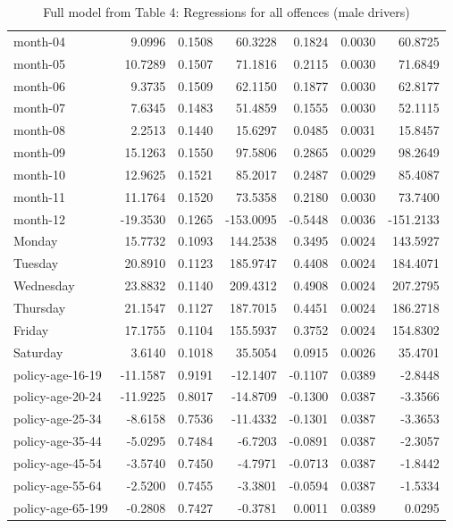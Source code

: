 \documentclass[10pt]{article}
\begin{document}
\begin{table}[ht]
\begin{tabular}{lrrrrrr}
  month-04 & 9.0996 & 0.1508 & 60.3228 & 0.1824 & 0.0030 & 60.8725 \\ 
  month-05 & 10.7289 & 0.1507 & 71.1816 & 0.2115 & 0.0030 & 71.6849 \\ 
  month-06 & 9.3735 & 0.1509 & 62.1150 & 0.1877 & 0.0030 & 62.8177 \\ 
  month-07 & 7.6345 & 0.1483 & 51.4859 & 0.1555 & 0.0030 & 52.1115 \\ 
  month-08 & 2.2513 & 0.1440 & 15.6297 & 0.0485 & 0.0031 & 15.8457 \\ 
  month-09 & 15.1263 & 0.1550 & 97.5806 & 0.2865 & 0.0029 & 98.2649 \\ 
  month-10 & 12.9625 & 0.1521 & 85.2017 & 0.2487 & 0.0029 & 85.4087 \\ 
  month-11 & 11.1764 & 0.1520 & 73.5358 & 0.2180 & 0.0030 & 73.7400 \\ 
  month-12 & -19.3530 & 0.1265 & -153.0095 & -0.5448 & 0.0036 & -151.2133 \\ 
  Monday & 15.7732 & 0.1093 & 144.2538 & 0.3495 & 0.0024 & 143.5927 \\ 
  Tuesday & 20.8910 & 0.1123 & 185.9747 & 0.4408 & 0.0024 & 184.4071 \\ 
  Wednesday & 23.8832 & 0.1140 & 209.4312 & 0.4908 & 0.0024 & 207.2795 \\ 
  Thursday & 21.1547 & 0.1127 & 187.7015 & 0.4451 & 0.0024 & 186.2718 \\ 
  Friday & 17.1755 & 0.1104 & 155.5937 & 0.3752 & 0.0024 & 154.8302 \\ 
  Saturday & 3.6140 & 0.1018 & 35.5054 & 0.0915 & 0.0026 & 35.4701 \\ 
  policy-age-16-19 & -11.1587 & 0.9191 & -12.1407 & -0.1107 & 0.0389 & -2.8448 \\ 
  policy-age-20-24 & -11.9225 & 0.8017 & -14.8709 & -0.1300 & 0.0387 & -3.3566 \\ 
  policy-age-25-34 & -8.6158 & 0.7536 & -11.4332 & -0.1301 & 0.0387 & -3.3653 \\ 
  policy-age-35-44 & -5.0295 & 0.7484 & -6.7203 & -0.0891 & 0.0387 & -2.3057 \\ 
  policy-age-45-54 & -3.5740 & 0.7450 & -4.7971 & -0.0713 & 0.0387 & -1.8442 \\ 
  policy-age-55-64 & -2.5200 & 0.7455 & -3.3801 & -0.0594 & 0.0387 & -1.5334 \\ 
  policy-age-65-199 & -0.2808 & 0.7427 & -0.3781 & 0.0011 & 0.0389 & 0.0295 \\ 
   \hline
\end{tabular}
\caption{Full model from Table 4: Regressions for all offences (male drivers)} 
\label{tab_4_all_pts_M}
\end{table}
\end{document}
